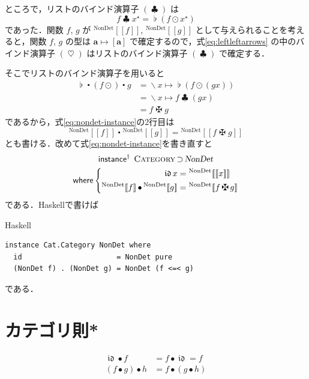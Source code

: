 \documentclass[a5paper,twoside,fleqn,draft]{jsbook}
\def\[{[\![}
\def\]{]\!]}
\newcommand{\programminglanguage}[1]{\textsf{#1}}
\newcommand{\haskell}{\programminglanguage{Haskell}}
\newenvironment{haskellcode}{\begin{itembox}[r]{\haskell}}{\end{itembox}}
\newcommand{\mKeyword}[1]{\mathsf{#1}}
\newcommand{\mInstanceDeclKeyword}{\mKeyword{instance}}
\newcommand{\mWhereKeyword}{\mKeyword{where}}
\DeclareMathOperator{\mInstanceDeclPolymorphic}{\mInstanceDeclKeyword^{\dagger}}
\DeclareMathOperator{\mSuperSet}{\supset}
\DeclareMathOperator{\mWhere}{\mWhereKeyword}
\newcommand{\mVarSpecialFunc}[1]{\mathfrak{#1}}
\DeclareMathOperator{\mIdCat}{\mVarSpecialFunc{id}}
\DeclareMathOperator{\mBind}{\heartsuit}
\DeclareMathOperator{\mBindComp}{\maltese}
\DeclareMathOperator{\mBindList}{\clubsuit}
\DeclareMathOperator{\mComp}{\centerdot}
\DeclareMathOperator{\mCompCat}{\bullet}
\DeclareMathOperator{\mFuncArrow}{\mapsto}
\DeclareMathOperator{\mJoinList}{\flat} %
\DeclareMathOperator{\mLambda}{\backslash}
\DeclareMathOperator{\mLambdaArrow}{\mapsto}
\DeclareMathOperator{\mMapList}{\odot}
\newcommand{\mType}[1]{\mathbf{#1}} %
\newcommand{\mA}{\mType{a}}
\newcommand{\mTypeConstructor}[1]{\textsl{#1}}
\newcommand{\mValueConstructor}[1]{\mathrm{#1}}
\newcommand{\mValueWith}[2]{{}^\mValueConstructor{#1}\[#2\]}
\newcommand{\mPureWith}[1]{\[#1\]}
\newcommand{\mTypeClass}[1]{\textsc{#1}} %
\newcommand{\mCategoryTypeClass}{\mTypeClass{Category}}
\newcommand{\mList}[1]{{#1}^\mathrm{\star}}
\begin{document}
ところで，リストのバインド演算子 $(\mBindList)$ は
\begin{equation}
  f\mBindList\mList{x}
  =\mJoinList(f\mMapList\mList{x})
\end{equation}
であった．関数 $f$, $g$ が $\mValueWith{NonDet}{f}$,
$\mValueWith{NonDet}{g}$ として与えられることを考えると，関数 $f$, $g$
の型は $\mA\mFuncArrow[\mA]$ で確定するので，式\eqref{eq:leftleftarrows}
の中のバインド演算子 $(\mBind)$ はリストのバインド演算子
$(\mBindList)$ で確定する．

そこでリストのバインド演算子を用いると
\begin{align}
  \mJoinList\mComp(f\mMapList)\mComp g
  &=\mLambda x\mLambdaArrow\mJoinList(f\mMapList(gx))\\
  &=\mLambda x\mLambdaArrow f\mBindList(gx)\\
  &=f\mBindComp g
\end{align}
であるから，式\eqref{eq:nondet-instance}の2行目は
\begin{equation}
  \mValueWith{NonDet}{f}\mComp\mValueWith{NonDet}{g}
  =\mValueWith{NonDet}{f\mBindComp g}
\end{equation}
とも書ける．改めて式\eqref{eq:nondet-instance}を書き直すと
\begin{multline}
  \mInstanceDeclPolymorphic\;
  \mCategoryTypeClass\mSuperSet\mTypeConstructor{NonDet}\\
  \mWhere\left\{
  \begin{aligned}
    \mIdCat x
    &=\mValueWith{NonDet}{\mPureWith{x}}\\ %
    \mValueWith{NonDet}{f}\mCompCat\mValueWith{NonDet}{g}
    &=\mValueWith{NonDet}{f\mBindComp g}
  \end{aligned}
  \right.
\end{multline}
である．\haskell で書けば
\begin{haskellcode}
\begin{verbatim}
instance Cat.Category NonDet where
  id                      = NonDet pure
  (NonDet f) . (NonDet g) = NonDet (f <=< g)
\end{verbatim}
\end{haskellcode}
である．

\section{カテゴリ則*}

\begin{align}
\mIdCat\mCompCat f&=f\mCompCat\mIdCat=f\\
(f\mCompCat g)\mCompCat h&=f\mCompCat(g\mCompCat h)
\end{align}
\end{document}
